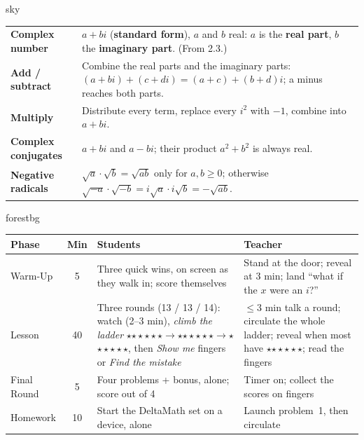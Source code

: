 \documentclass[10pt]{article}
\newcommand{\MeetingLength}{60 minutes}
\newcommand{\rung}[1]{{\color{goldacc}\ifcase#1\or$\star$\or$\star\star$\or$\star\star\star$\fi}}
\begin{document}
\begin{skillbox}{sky}
\renewcommand{\arraystretch}{1.3}
\begin{tabularx}{\linewidth}{@{}l X@{}}
\textbf{Complex number} & $a+bi$ (\textbf{standard form}), $a$ and $b$ real: $a$ is the
                          \textbf{real part}, $b$ the \textbf{imaginary part}. (From 2.3.) \\
\textbf{Add / subtract} & Combine the real parts and the imaginary parts:
                          $(a+bi)+(c+di)=(a+c)+(b+d)i$; a minus reaches both parts. \\
\textbf{Multiply} & Distribute every term, replace every $i^2$ with $-1$, combine into $a+bi$. \\
\textbf{Complex conjugates} & $a+bi$ and $a-bi$; their product $a^2+b^2$ is always real. \\
\textbf{Negative radicals} & $\sqrt a\cdot\sqrt b=\sqrt{ab}$ only for $a,b\ge0$; otherwise
                             $\sqrt{-a}\cdot\sqrt{-b}=i\sqrt a\cdot i\sqrt b=-\sqrt{ab}$. \\
\end{tabularx}
\end{skillbox}

\begin{fixedskillbox}[Lesson at a Glance --- \MeetingLength]{forestbg}
\renewcommand{\arraystretch}{1.25}
\begin{tabularx}{\linewidth}{@{}l c X X@{}}
\textbf{Phase} & \textbf{Min} & \textbf{Students} & \textbf{Teacher} \\
\hline
Warm-Up & 5 & Three quick wins, on screen as they walk in; score themselves & Stand at the door; reveal at 3 min; land ``what if the $x$ were an $i$?'' \\
Lesson & 40 & Three rounds (13 / 13 / 14): watch (2--3 min), \emph{climb the ladder} \rung1$\to$\rung2$\to$\rung3, then \emph{Show me} fingers or \emph{Find the mistake} & $\le$3 min talk a round; circulate the whole ladder; reveal when most have \rung2; read the fingers \\
Final Round & 5 & Four problems + bonus, alone; score out of 4 & Timer on; collect the scores on fingers \\
Homework & 10 & Start the DeltaMath set on a device, alone & Launch problem~1, then circulate \\
\end{tabularx}
\end{fixedskillbox}
\end{document}
